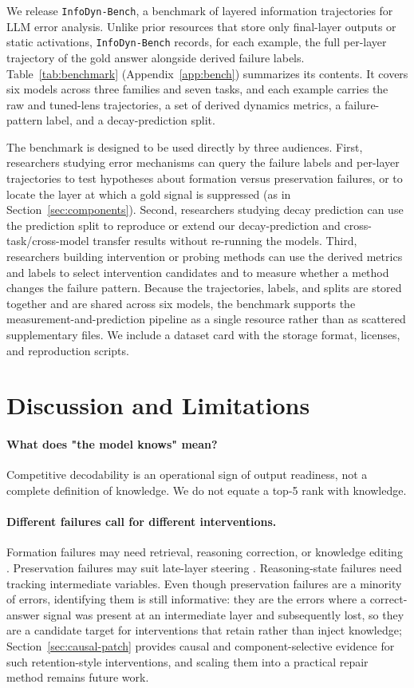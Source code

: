 \documentclass{article} %
\begin{document}
We release \texttt{InfoDyn-Bench}, a benchmark of layered information trajectories for LLM error analysis. Unlike prior resources that store only final-layer outputs or static activations, \texttt{InfoDyn-Bench} records, for each example, the full per-layer trajectory of the gold answer alongside derived failure labels. Table~\ref{tab:benchmark} (Appendix~\ref{app:bench}) summarizes its contents. It covers six models across three families and seven tasks, and each example carries the raw and tuned-lens trajectories, a set of derived dynamics metrics, a failure-pattern label, and a decay-prediction split.

The benchmark is designed to be used directly by three audiences. First, researchers studying error mechanisms can query the failure labels and per-layer trajectories to test hypotheses about formation versus preservation failures, or to locate the layer at which a gold signal is suppressed (as in Section~\ref{sec:components}). Second, researchers studying decay prediction can use the prediction split to reproduce or extend our decay-prediction and cross-task/cross-model transfer results without re-running the models. Third, researchers building intervention or probing methods can use the derived metrics and labels to select intervention candidates and to measure whether a method changes the failure pattern. Because the trajectories, labels, and splits are stored together and are shared across six models, the benchmark supports the measurement-and-prediction pipeline as a single resource rather than as scattered supplementary files. We include a dataset card with the storage format, licenses, and reproduction scripts.

\section{Discussion and Limitations}

\paragraph{What does "the model knows" mean?}
Competitive decodability is an operational sign of output readiness, not a complete definition of knowledge. We do not equate a top-5 rank with knowledge.

\paragraph{Different failures call for different interventions.}
Formation failures may need retrieval, reasoning correction, or knowledge editing \citep{meng2022rome}. Preservation failures may suit late-layer steering \citep{turner2023activation, zou2023representation}. Reasoning-state failures need tracking intermediate variables. Even though preservation failures are a minority of errors, identifying them is still informative: they are the errors where a correct-answer signal was present at an intermediate layer and subsequently lost, so they are a candidate target for interventions that retain rather than inject knowledge; Section~\ref{sec:causal-patch} provides causal and component-selective evidence for such retention-style interventions, and scaling them into a practical repair method remains future work.
\end{document}
